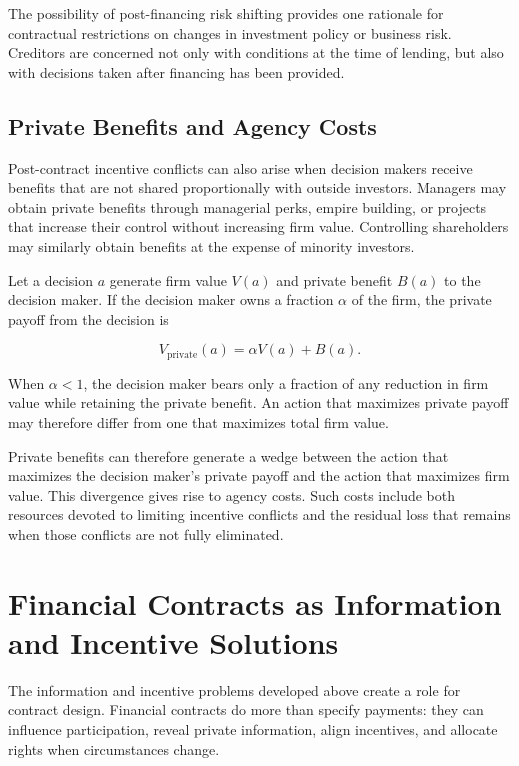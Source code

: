 The possibility of post-financing risk shifting provides one rationale for contractual restrictions on changes in investment policy or business risk. Creditors are concerned not only with conditions at the time of lending, but also with decisions taken after financing has been provided.

\subsection{Private Benefits and Agency Costs}

Post-contract incentive conflicts can also arise when decision makers receive benefits that are not shared proportionally with outside investors. Managers may obtain private benefits through managerial perks, empire building, or projects that increase their control without increasing firm value. Controlling shareholders may similarly obtain benefits at the expense of minority investors.

Let a decision $a$ generate firm value $V(a)$ and private benefit $B(a)$ to the decision maker. If the decision maker owns a fraction $\alpha$ of the firm, the private payoff from the decision is

\begin{equation}
V_{\text{private}}(a)=\alpha V(a)+B(a).
\label{eq:ch3-private-benefits}
\end{equation}

When $\alpha<1$, the decision maker bears only a fraction of any reduction in firm value while retaining the private benefit. An action that maximizes private payoff may therefore differ from one that maximizes total firm value.

Private benefits can therefore generate a wedge between the action that maximizes the decision maker's private payoff and the action that maximizes firm value. This divergence gives rise to agency costs. Such costs include both resources devoted to limiting incentive conflicts and the residual loss that remains when those conflicts are not fully eliminated.

\section{Financial Contracts as Information and Incentive Solutions}

The information and incentive problems developed above create a role for contract design. Financial contracts do more than specify payments: they can influence participation, reveal private information, align incentives, and allocate rights when circumstances change.

